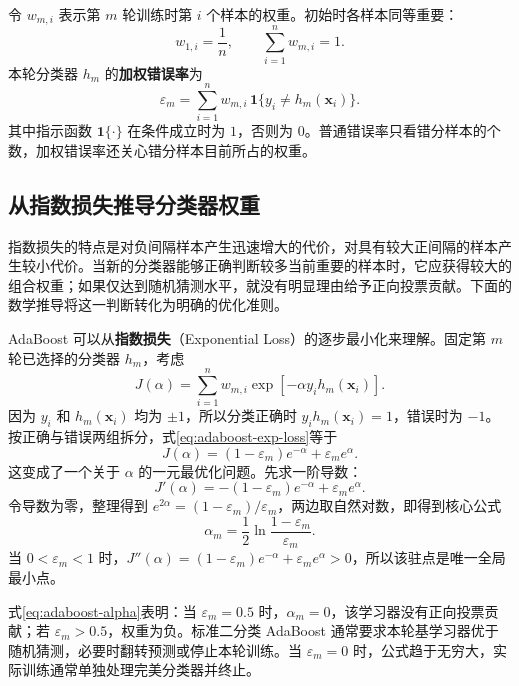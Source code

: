 令 $w_{m,i}$ 表示第 $m$ 轮训练时第 $i$ 个样本的权重。初始时各样本同等重要：
\begin{equation}\label{eq:adaboost-init}
w_{1,i}=\frac1n,\qquad \sum_{i=1}^{n}w_{m,i}=1.
\end{equation}
本轮分类器 $h_m$ 的\textbf{加权错误率}为
\begin{equation}\label{eq:adaboost-error}
\varepsilon_m=\sum_{i=1}^{n}w_{m,i}
\,\mathbf1\{y_i\ne h_m(\boldsymbol x_i)\}.
\end{equation}
其中指示函数 $\mathbf1\{\cdot\}$ 在条件成立时为 $1$，否则为 $0$。普通错误率只看错分样本的个数，加权错误率还关心错分样本目前所占的权重。

\subsection{从指数损失推导分类器权重}

指数损失的特点是对负间隔样本产生迅速增大的代价，对具有较大正间隔的样本产生较小代价。当新的分类器能够正确判断较多当前重要的样本时，它应获得较大的组合权重；如果仅达到随机猜测水平，就没有明显理由给予正向投票贡献。下面的数学推导将这一判断转化为明确的优化准则。

AdaBoost 可以从\textbf{指数损失}（Exponential Loss）的逐步最小化来理解。固定第 $m$ 轮已选择的分类器 $h_m$，考虑
\begin{equation}\label{eq:adaboost-exp-loss}
J(\alpha)=\sum_{i=1}^{n}w_{m,i}
\exp[-\alpha y_i h_m(\boldsymbol x_i)].
\end{equation}
因为 $y_i$ 和 $h_m(\boldsymbol x_i)$ 均为 $\pm1$，所以分类正确时 $y_i h_m(\boldsymbol x_i)=1$，错误时为 $-1$。按正确与错误两组拆分，式\eqref{eq:adaboost-exp-loss}等于
\[
J(\alpha)=(1-\varepsilon_m)e^{-\alpha}+\varepsilon_m e^\alpha.
\]
这变成了一个关于 $\alpha$ 的一元最优化问题。先求一阶导数：
\[
J'(\alpha)=-(1-\varepsilon_m)e^{-\alpha}
+\varepsilon_m e^\alpha.
\]
令导数为零，整理得到 $e^{2\alpha}=(1-\varepsilon_m)/\varepsilon_m$，两边取自然对数，即得到核心公式
\begin{equation}\label{eq:adaboost-alpha}
\alpha_m=\frac12\ln\frac{1-\varepsilon_m}{\varepsilon_m}.
\end{equation}
当 $0<\varepsilon_m<1$ 时，$J''(\alpha)=(1-\varepsilon_m)e^{-\alpha}+\varepsilon_m e^\alpha>0$，所以该驻点是唯一全局最小点。

式\eqref{eq:adaboost-alpha}表明：当 $\varepsilon_m=0.5$ 时，$\alpha_m=0$，该学习器没有正向投票贡献；若 $\varepsilon_m>0.5$，权重为负。标准二分类 AdaBoost 通常要求本轮基学习器优于随机猜测，必要时翻转预测或停止本轮训练。当 $\varepsilon_m=0$ 时，公式趋于无穷大，实际训练通常单独处理完美分类器并终止。

